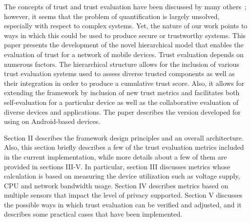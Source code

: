 The concepts of trust and trust evaluation have been discussed by many others~\cite{jing2014riskmon,shabtai2010google,zheng2014droidray}; 
however, it seems that the problem  of quantification is largely unsolved, especially with respect to complex systems.
 Yet, the nature of our work points to ways in which 
this could be used to produce secure or trustworthy systems.  
This paper presents the development of the novel hierarchical model that enables the  evaluation of trust for a network of 
mobile devices. Trust evaluation depends on numerous factors. The hierarchical structure allows for the
inclusion of various trust evaluation systems used to assess diverse trusted components as well as their integration in 
order to produce a cumulative trust score. Also, it allows for extending the framework by inclusion of new trust metrics
and facilitates both self-evaluation for a particular device as well as the collaborative evaluation of diverse devices 
and applications. 
The paper describes the version developed for using on Android-based devices.

Section II describes the framework design principles and an overall architecture. Also, this section 
 briefly describes a few of the trust evaluation metrics included in the current implementation,
while more details about a few of them are provided in sections III-V. In particular, section III discusses metrics whose 
calculation is based on measuring the device utilization such as voltage supply, CPU and network bandwidth usage. 
Section IV describes metrics based on multiple sensors that impact the level of privacy supported. 
Section V discusses the possible ways in which trust evaluation can be verified and adjusted, and it 
describes some practical cases that have been implemented.
